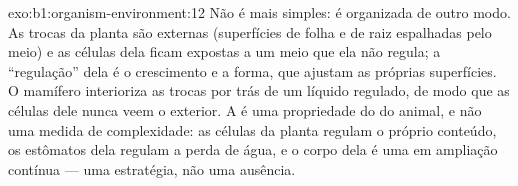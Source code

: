 \begin{solution}{exo:b1:organism-environment:12}
Não é mais simples: é organizada de outro modo. As trocas da planta são
externas (superfícies de folha e de raiz espalhadas pelo meio) e as
células dela ficam expostas a um meio que ela não regula; a
``regulação'' dela é o crescimento e a forma, que ajustam as próprias
superfícies. O mamífero interioriza as trocas por trás de um líquido
regulado, de modo que as células dele nunca veem o exterior. A
 é uma propriedade do  do animal, e não uma medida
de complexidade: as células da planta regulam o próprio conteúdo, os
estômatos dela regulam a perda de água, e o corpo dela é uma  em ampliação contínua --- uma estratégia, não uma ausência.
\end{solution}


